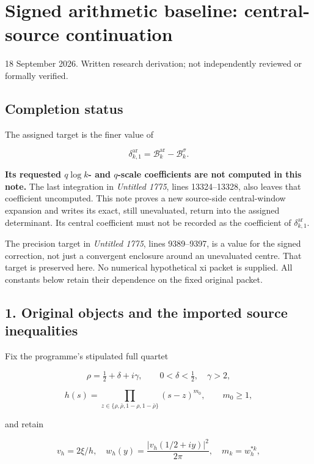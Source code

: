 \section{Signed arithmetic baseline: central-source continuation}\label{signed-arithmetic-baseline-central-source-continuation}

18 September 2026. Written research derivation; not independently reviewed or formally verified.

\subsection{Completion status}\label{completion-status}

The assigned target is the finer value of

\[
\delta_{k,1}^{\mathrm{ar}}=\mathcal B_k^{\mathrm{ar}}-\mathcal B_k^\sigma.
\]

\textbf{Its requested \(q\log k\)- and \(q\)-scale coefficients are not computed in this note.} The last integration in \emph{Untitled 1775}, lines 13324--13328, also leaves that coefficient uncomputed. This note proves a new source-side central-window expansion and writes its exact, still unevaluated, return into the assigned determinant. Its central coefficient must not be recorded as the coefficient of \(\delta_{k,1}^{\mathrm{ar}}\).

The precision target in \emph{Untitled 1775}, lines 9389--9397, is a value for the signed correction, not just a convergent enclosure around an unevaluated centre. That target is preserved here. No numerical hypothetical xi packet is supplied. All constants below retain their dependence on the fixed original packet.

\subsection{1. Original objects and the imported source inequalities}\label{original-objects-and-the-imported-source-inequalities}

Fix the programme's stipulated full quartet

\[
\rho=\tfrac12+\delta+i\gamma,\qquad
0<\delta<\tfrac12,\quad\gamma>2,
\]

\[
h(s)=\prod_{z\in\{\rho,\bar\rho,1-\rho,1-\bar\rho\}}(s-z)^{m_0},
\qquad m_0\ge1,
\]

and retain

\[
v_h=2\xi/h,\quad
w_h(y)=\frac{|v_h(1/2+iy)|^2}{2\pi},\quad m_k=w_h^{*k},
\]

